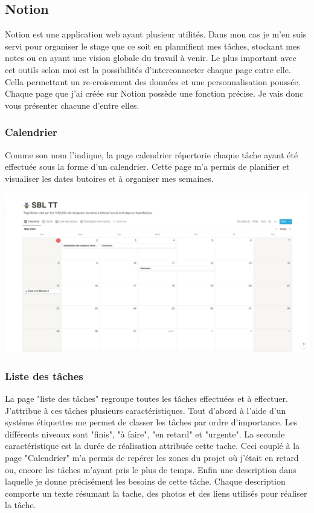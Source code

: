 \documentclass[12pt,french,a4paper]{article}
\begin{document}
\subsection{Notion}
Notion est une application web ayant plusieur utilités. Dans mon cas je m'en suis servi pour organiser le stage que ce soit en plannifient mes tâches, stockant mes notes ou en ayant une vision globale du travail à venir. Le plus important avec cet outils selon moi est la possibilités d'interconnecter chaque page entre elle. Cella permettant un re-croisement des données et une personnalisation poussée.  
\\
Chaque page que j'ai créée sur Notion possède une fonction précise. Je vais donc vous présenter chacune d'entre elles.

\subsubsection{Calendrier}
Comme son nom l'indique, la page calendrier répertorie chaque tâche ayant été effectuée sous la forme d'un calendrier. Cette page m'a permis de planifier et visualiser les dates butoires et à organiser mes semaines.    
\begin{center}	
\includegraphics[scale=0.35]{../img/notioncalender.png}
\label{Calendrier}
\end{center}

\subsubsection{Liste des tâches}
La page "liste des tâches" regroupe toutes les tâches effectuées et à effectuer. J'attribue à ces tâches plusieurs caractéristiques. Tout d'abord à l'aide d'un système  étiquettes me permet de classer les tâches par ordre d'importance. Les différents niveaux sont "finis", "à faire", "en retard" et "urgente". La seconde caractéristique est la durée de réalisation attribuée cette tache. Ceci  couplé à la page "Calendrier" m'a permis de repérer les zones du projet où j'était en retard ou, encore les tâches m'ayant pris le plus de temps. Enfin une description dans laquelle je donne précisément les besoins de cette tâche. Chaque description comporte un texte résumant la tache, des photos et des liens utilisés pour réaliser la tâche.
\end{document}

